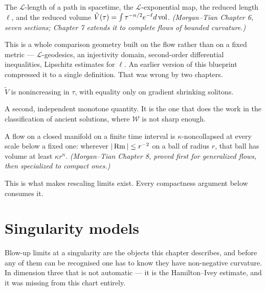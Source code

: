 \begin{definition}
  \label{def:reduced-volume}
  The $\mathcal{L}$-length of a path in spacetime, the $\mathcal{L}$-exponential
  map, the reduced length $\ell$, and the reduced volume
  $\tilde V(\tau) = \int \tau^{-n/2} e^{-\ell} d\operatorname{vol}$.
  \emph{(Morgan--Tian Chapter 6, seven sections; Chapter 7 extends it to
  complete flows of bounded curvature.)}

  This is a whole comparison geometry built on the flow rather than on a fixed
  metric --- $\mathcal{L}$-geodesics, an injectivity domain, second-order
  differential inequalities, Lipschitz estimates for $\ell$. An earlier version
  of this blueprint compressed it to a single definition. That was wrong by two
  chapters.
\end{definition}

\begin{theorem}
  \label{thm:reduced-volume-monotone}
  $\tilde V$ is nonincreasing in $\tau$, with equality only on gradient
  shrinking solitons.

  A second, independent monotone quantity. It is the one that does the work in
  the classification of ancient solutions, where $\mathcal{W}$ is not sharp
  enough.
\end{theorem}

\begin{theorem}
  \label{thm:no-local-collapsing}
  A flow on a closed manifold on a finite time interval is $\kappa$-noncollapsed
  at every scale below a fixed one: wherever $|\operatorname{Rm}| \le r^{-2}$ on a ball of
  radius $r$, that ball has volume at least $\kappa r^n$.
  \emph{(Morgan--Tian Chapter 8, proved first for generalized flows, then
  specialized to compact ones.)}

  This is what makes rescaling limits exist. Every compactness argument below
  consumes it.
\end{theorem}

\chapter{Singularity models}
\label{chap:kappa}
Blow-up limits at a singularity are the objects this chapter describes, and
before any of them can be recognised one has to know they have non-negative
curvature. In dimension three that is not automatic --- it is the
Hamilton--Ivey estimate, and it was missing from this chart entirely.

